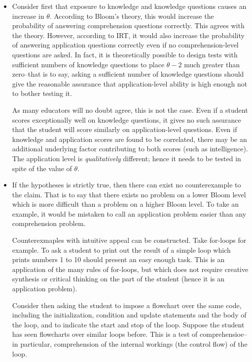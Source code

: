 \documentclass[a4paper,twocolumn]{article}
\begin{document}
\begin{itemize} 

\item Consider first that exposure to knowledge and knowledge questions causes
an increase in $\theta$.  According to Bloom's theory, this would increase the
probability of answering comprehension questions correctly.  This agrees with
the theory.  However, according to IRT, it would also increase the probability
of answering application questions correctly even if no comprehension-level
questions are asked.  In fact, it is theoretically possible to design tests
with sufficient numbers of knowledge questions to place $\theta-2$ much greater
than zero--that is to say, asking a sufficient number of knowledge questions
should give the reasonable assurance that application-level ability is high
enough not to bother testing it.

As many educators will no doubt agree, this is not the case. Even if a student
scores exceptionally well on knowledge questions, it gives no such assurance
that the student will score similarly on application-level questions.  Even if
knowledge and application scores are found to be correlated, there may be an
additional underlying factor contributing to both scores (such as
intelligence).  The application level is \emph{qualitatively} different; hence
it needs to be tested in spite of the value of $\theta$.


\item If the hypotheses is strictly true, then there can exist no
counterexample to the claim.  That is to say that there exists no problem on a
lower Bloom level which is more difficult than a problem on a higher Bloom
level.  To take an example, it would be mistaken to call an application problem
easier than any comprehension problem. 

Counterexmaples with intuitive appeal can be constructed.  Take for-loops for
example.  To ask a student to print out the result of a simple loop which
prints numbers 1 to 10 should present an easy enough task.  This is an
application of the many rules of for-loops, but which does not require creative
synthesis or critical thinking on the part of the student (hence it is an
application problem). 

Consider then asking the student to impose a flowchart over the same code,
including the initialization, condition and update statements and the body of
the loop, and to indicate the start and stop of the loop.  Suppose the student
has seen flowcharts over similar loops before.  This is a test of
comprehensioe--in particular, comprehension of the internal workings (the
control flow) of the loop.    


\end{itemize}
\end{document}
